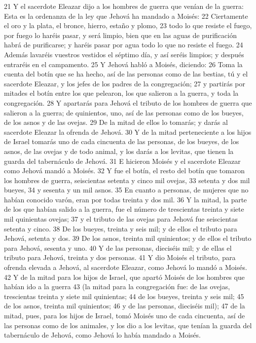 21 Y el sacerdote Eleazar dijo a los hombres de guerra que venían de la guerra: Esta es la ordenanza de la ley que Jehová ha mandado a Moisés:
22 Ciertamente el oro y la plata, el bronce, hierro, estaño y plomo, 
23 todo lo que resiste el fuego, por fuego lo haréis pasar, y será limpio, bien que en las aguas de purificación habrá de purificarse; y haréis pasar por agua todo lo que no resiste el fuego.
24 Además lavaréis vuestros vestidos el séptimo día, y así seréis limpios; y después entraréis en el campamento.
25 Y Jehová habló a Moisés, diciendo:
26 Toma la cuenta del botín que se ha hecho, así de las personas como de las bestias, tú y el sacerdote Eleazar, y los jefes de los padres de la congregación;
27 y partirás por mitades el botín entre los que pelearon, los que salieron a la guerra, y toda la congregación.
28 Y apartarás para Jehová el tributo de los hombres de guerra que salieron a la guerra; de quinientos, uno, así de las personas como de los bueyes, de los asnos y de las ovejas.
29 De la mitad de ellos lo tomarás; y darás al sacerdote Eleazar la ofrenda de Jehová.
30 Y de la mitad perteneciente a los hijos de Israel tomarás uno de cada cincuenta de las personas, de los bueyes, de los asnos, de las ovejas y de todo animal, y los darás a los levitas, que tienen la guarda del tabernáculo de Jehová.
31 E hicieron Moisés y el sacerdote Eleazar como Jehová mandó a Moisés.
32 Y fue el botín, el resto del botín que tomaron los hombres de guerra, seiscientas setenta y cinco mil ovejas,
33 setenta y dos mil bueyes,
34 y sesenta y un mil asnos.
35 En cuanto a personas, de mujeres que no habían conocido varón, eran por todas treinta y dos mil.
36 Y la mitad, la parte de los que habían salido a la guerra, fue el número de trescientas treinta y siete mil quinientas ovejas;
37 y el tributo de las ovejas para Jehová fue seiscientas setenta y cinco.
38 De los bueyes, treinta y seis mil; y de ellos el tributo para Jehová, setenta y dos.
39 De los asnos, treinta mil quinientos; y de ellos el tributo para Jehová, sesenta y uno. 
40 Y de las personas, dieciséis mil; y de ellas el tributo para Jehová, treinta y dos personas.
41 Y dio Moisés el tributo, para ofrenda elevada a Jehová, al sacerdote Eleazar, como Jehová lo mandó a Moisés.
42 Y de la mitad para los hijos de Israel, que apartó Moisés de los hombres que habían ido a la guerra
43 (la mitad para la congregación fue: de las ovejas, trescientas treinta y siete mil quinientas;
44 de los bueyes, treinta y seis mil;
45 de los asnos, treinta mil quinientos;
46 y de las personas, dieciséis mil);
47 de la mitad, pues, para los hijos de Israel, tomó Moisés uno de cada cincuenta, así de las personas como de los animales, y los dio a los levitas, que tenían la guarda del tabernáculo de Jehová, como Jehová lo había mandado a Moisés.
